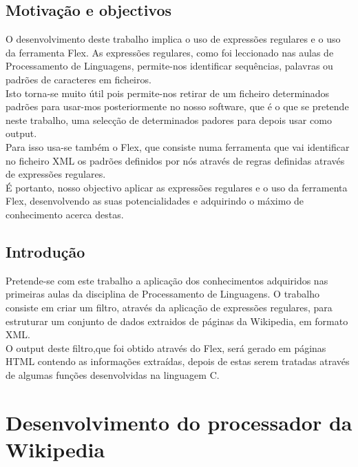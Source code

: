 \documentclass[a4paper,11pt,openright,openbib]{report}
\begin{document}
\section{Motivação e objectivos}
O desenvolvimento deste trabalho implica o uso de expressões regulares e o uso da ferramenta Flex. As expressões regulares, como foi leccionado nas aulas de Processamento de Linguagens, permite-nos identificar sequências, palavras ou padrões de caracteres em ficheiros.\\
Isto torna-se muito útil pois permite-nos retirar de um ficheiro determinados padrões para usar-mos posteriormente no nosso software, que é o que se pretende neste trabalho, uma selecção de determinados padores para depois usar como output.\\
Para isso usa-se também o Flex, que consiste numa ferramenta que vai identificar no ficheiro XML os padrões definidos por nós através de regras definidas através de expressões regulares.\\
É portanto, nosso objectivo aplicar as expressões regulares e o uso da ferramenta Flex, desenvolvendo as suas potencialidades e adquirindo o máximo de conhecimento acerca destas.\\
\section{Introdução}
Pretende-se com este trabalho a aplicação dos conhecimentos adquiridos nas primeiras aulas da disciplina de Processamento de Linguagens.
O trabalho consiste em criar um filtro, através da aplicação de expressões regulares, para estruturar um conjunto de dados extraidos de páginas da Wikipedia, em formato XML.\\
O output deste filtro,que foi obtido através do Flex, será gerado em páginas HTML contendo as informações extraídas, depois de estas serem tratadas através de algumas funções desenvolvidas na linguagem C.\\

\newpage
\chapter{Desenvolvimento do processador da Wikipedia}
\end{document}
